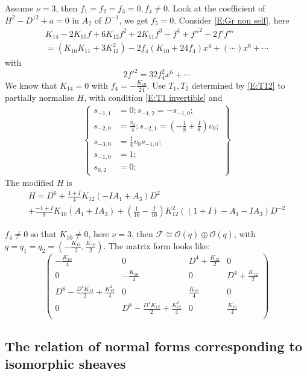 \documentclass[11pt]{article}
\theoremstyle{definition}
\theoremstyle{plain}
\numberwithin{equation}{section}
\begin{document}
Assume $\nu=3$, then $f_1=f_2=f_3=0,f_4\neq 0$. Look at the coefficient of $H^2-D^{12}+a=0$ in $A_2$ of $D^{-1}$, we get $f_5=0$. Consider \eqref{E:Gr non self}, here 
\begin{multline*}
	K_{14}-2K_{10}f+6K_{12}f^2+2K_{11}f^3-f^4+f''^2-2f'f'''
	\\=(K_{10} K_{11}+3 K_{12}^2)-2f_4(K_{10}+24f_4)x^4+(\cdots)x^6+\cdots
\end{multline*}
with
$$
2f'^2=32f_4^2x^6+\cdots
$$
We know that $K_{14}=0$ with $f_4=-\frac{K_{10}}{24}$. Use $T_1, T_2$ determined by \eqref{E:T12} to partially normalise $H$, with  condition \eqref{E:T1 invertible} and 
\begin{align}
	\label{E:Second conjugation nonself v=3}
	\left\{\begin{aligned}
		s_{-1,1}&=0;s_{-1,2}=-s_{-1,0};
		\\s_{-2,0}&=\frac{v_0}{4};s_{-2,1}=(-\frac{1}{8}+\frac{I}{8}) v_0;
		\\s_{-3,0}&=\frac{1}{4} v_0 s_{-1,0};
		\\ s_{-1,0}&=1;
		\\s_{0,2}&=  0;
		\end{aligned}\right\}
\end{align}
The modified  $H$ is 
\begin{multline*}
	H=D^6+\frac{1+I}{4}K_{12}(-IA_1+A_3)D^2
	\\+\frac{-1+I}{8}K_{10}(A_1+IA_3)+(\frac{1}{16}-\frac{I}{16}) K_{12}^2 ((1+I)-A_1-I A_3)D^{-2}
\end{multline*}

$f_4\neq 0$ so that $K_{10}\neq 0$, here $\nu=3$, then $\mathcal{F}\cong \mathcal{O}(q)\oplus \mathcal{O}(q)$, with $q=q_1=q_2=(-\frac{K_{12}}{2},\frac{K_{10}}{2})$. The matrix form looks like:
	$$
	\left(
	\begin{array}{cccc}
		-\frac{K_{10}}{4} & 0 & D^4+\frac{K_{12}}{2} & 0 \\
		0 & -\frac{K_{10}}{4} & 0 & D^4+\frac{K_{12}}{2} \\
		D^8-\frac{D^4 K_{12}}{2}+\frac{K_{12}^2}{4} & 0 & \frac{K_{10}}{4} & 0 \\
		0 & D^8-\frac{D^4 K_{12}}{2}+\frac{K_{12}^2}{4} & 0 & \frac{K_{10}}{4} \\
	\end{array}
	\right)
	$$


\subsection{The relation of normal forms corresponding to isomorphic sheaves}
\label{S:last_subsection}
\end{document}
